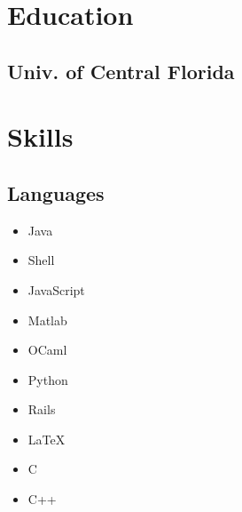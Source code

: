 \documentclass[letterpaper]{resume}
\begin{document}



\begin{minipage}[t]{0.33\textwidth} %


\section{Education}

\subsection{Univ. of Central Florida}

\sectionspace %


\section{Skills}

\subsection{Languages}
\begin{itemize}
\item Java
\item Shell
\item JavaScript
\item Matlab
\item OCaml
\item Python
\item Rails
\item \LaTeX\
\item C
\item C++
\end{itemize}


\end{minipage}
\end{document}
